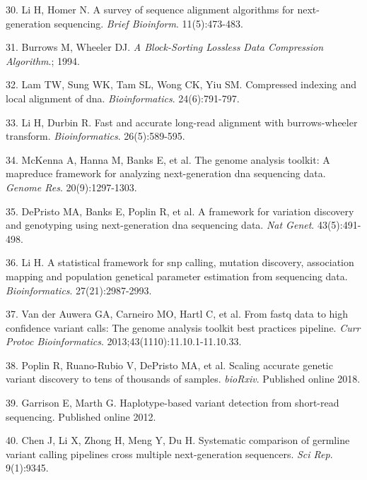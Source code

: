 \documentclass[11pt,letterpaper]{book}
\begin{document}
\leavevmode\hypertarget{ref-li:2010aa}{}%
30. Li H, Homer N. A survey of sequence alignment algorithms for next-generation sequencing. \emph{Brief Bioinform}. 11(5):473-483.

\leavevmode\hypertarget{ref-burrows:1994aa}{}%
31. Burrows M, Wheeler DJ. \emph{A Block-Sorting Lossless Data Compression Algorithm}.; 1994.

\leavevmode\hypertarget{ref-lam:2008aa}{}%
32. Lam TW, Sung WK, Tam SL, Wong CK, Yiu SM. Compressed indexing and local alignment of dna. \emph{Bioinformatics}. 24(6):791-797.

\leavevmode\hypertarget{ref-li:2010ab}{}%
33. Li H, Durbin R. Fast and accurate long-read alignment with burrows-wheeler transform. \emph{Bioinformatics}. 26(5):589-595.

\leavevmode\hypertarget{ref-mckenna:2010aa}{}%
34. McKenna A, Hanna M, Banks E, et al. The genome analysis toolkit: A mapreduce framework for analyzing next-generation dna sequencing data. \emph{Genome Res}. 20(9):1297-1303.

\leavevmode\hypertarget{ref-depristo:2011aa}{}%
35. DePristo MA, Banks E, Poplin R, et al. A framework for variation discovery and genotyping using next-generation dna sequencing data. \emph{Nat Genet}. 43(5):491-498.

\leavevmode\hypertarget{ref-li:2011aa}{}%
36. Li H. A statistical framework for snp calling, mutation discovery, association mapping and population genetical parameter estimation from sequencing data. \emph{Bioinformatics}. 27(21):2987-2993.

\leavevmode\hypertarget{ref-van-der-auwera:2013aa}{}%
37. Van der Auwera GA, Carneiro MO, Hartl C, et al. From fastq data to high confidence variant calls: The genome analysis toolkit best practices pipeline. \emph{Curr Protoc Bioinformatics}. 2013;43(1110):11.10.1-11.10.33.

\leavevmode\hypertarget{ref-poplin:2018aa}{}%
38. Poplin R, Ruano-Rubio V, DePristo MA, et al. Scaling accurate genetic variant discovery to tens of thousands of samples. \emph{bioRxiv}. Published online 2018.

\leavevmode\hypertarget{ref-garrison:2012aa}{}%
39. Garrison E, Marth G. Haplotype-based variant detection from short-read sequencing. Published online 2012.

\leavevmode\hypertarget{ref-chen:2019aa}{}%
40. Chen J, Li X, Zhong H, Meng Y, Du H. Systematic comparison of germline variant calling pipelines cross multiple next-generation sequencers. \emph{Sci Rep}. 9(1):9345.
\end{document}
